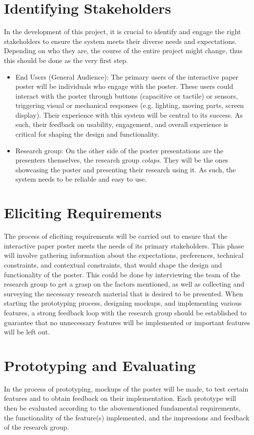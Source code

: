 \section{Identifying Stakeholders}
In the development of this project, it is crucial to identify and engage the right stakeholders to ensure the system meets their diverse needs and expectations. Depending on who they are, the course of the entire project might change, thus this should be done as the very first step.
\begin{itemize}
	\item End Users (General Audience): The primary users of the interactive paper poster will be individuals who engage with the poster. These users could interact with the poster through buttons (capacitive or tactile) or sensors, triggering visual or mechanical responses (e.g. lighting, moving parts, screen display). Their experience with this system will be central to its success. As such, their feedback on usability, engagement, and overall experience is critical for shaping the design and functionality.
	\item  Research group: On the other side of the poster presentations are the presenters themselves, the research group \emph{colaps}. They will be the ones showcasing the poster and presenting their research using it. As such, the system needs to be reliable and easy to use.
\end{itemize}

\section{Eliciting Requirements}
The process of eliciting requirements will be carried out to ensure that the interactive paper poster meets the needs of its primary stakeholders. This phase will involve gathering information about the expectations, preferences, technical constraints, and contextual constraints, that would shape the design and functionality of the poster.
This could be done by interviewing the team of the research group to get a grasp on the factors mentioned, as well as collecting and surveying the necessary research material that is desired to be presented.
When starting the prototyping process, designing mockups, and implementing various features, a strong feedback loop with the research group should be established to guarantee that no unnecessary features will be implemented or important features will be left out.


\section{Prototyping and Evaluating}
In the process of prototyping, mockups of the poster will be made, to test certain features and to obtain feedback on their implementation. Each prototype will then be evaluated according to the abovementioned fundamental requirements, the functionality of the feature(s) implemented, and the impressions and feedback of the research group.\\\\


